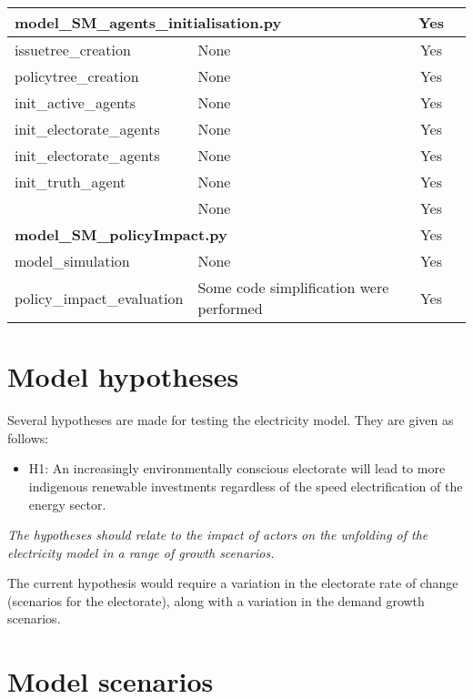 \documentclass[12pt]{article}
\begin{document}
\begin{longtable}{|l|p{6cm}|c|c|}
\multicolumn{2}{|l|}{{\bfseries model\_SM\_agents\_initialisation.py}}
									& Yes	\\ \hline
issuetree\_creation			& None		& Yes	\\ \hline
policytree\_creation			& None		& Yes	\\ \hline
init\_active\_agents			& None		& Yes	\\ \hline
init\_electorate\_agents		& None		& Yes	\\ \hline
init\_electorate\_agents		& None		& Yes	\\ \hline
init\_truth\_agent			& None		& Yes	\\ \hline
						& None		& Yes	\\ \hline
\multicolumn{2}{|l|}{{\bfseries model\_SM\_policyImpact.py}}
									& Yes	\\ \hline
model\_simulation			& None		& Yes	\\ \hline
policy\_impact\_evaluation	& Some code simplification were performed
									& Yes	\\ \hline
	
\end{longtable}


\section{Model hypotheses}
\label{sec:hypotheses}

Several hypotheses are made for testing the electricity model. They are given as follows:

\begin{itemize}
\item H1: An increasingly environmentally conscious electorate will lead to more indigenous renewable investments regardless of the speed electrification of the energy sector.
\end{itemize}


\emph{The hypotheses should relate to the impact of actors on the unfolding of the electricity model in a range of growth scenarios.}

The current hypothesis would require a variation in the electorate rate of change (scenarios for the electorate), along with a variation in the demand growth scenarios.


\section{Model scenarios}
\label{sec:steps}
\end{document}
